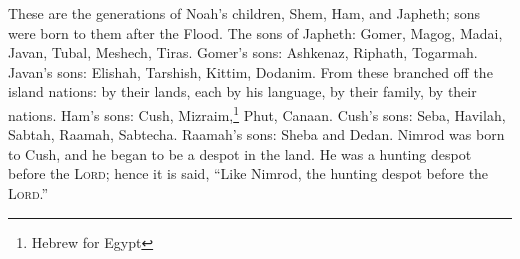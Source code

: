 
\begin{inparaenum}
     These are the generations of Noah's children, Shem, Ham, and Japheth; sons were born to them after the Flood.%
     The sons of Japheth: Gomer, Magog, Madai, Javan, Tubal, Meshech, Tiras.%
     Gomer's sons: Ashkenaz, Riphath, Togarmah.%
     Javan's sons: Elishah, Tarshish, Kittim, Dodanim.%
     From these branched off the island nations: by their lands, each by his language, by their family, by their nations.%
     Ham's sons: Cush, Mizraim,\footnote{Hebrew for Egypt} Phut, Canaan.%
     Cush's sons: Seba, Havilah, Sabtah, Raamah, Sabtecha. Raamah's sons: Sheba and Dedan.%
     Nimrod was born to Cush, and he began to be a despot in the land.%
     He was a hunting despot before the \textsc{Lord}; hence it is said, ``Like Nimrod, the hunting despot before the \textsc{Lord}.''%
    
    
\end{inparaenum}
